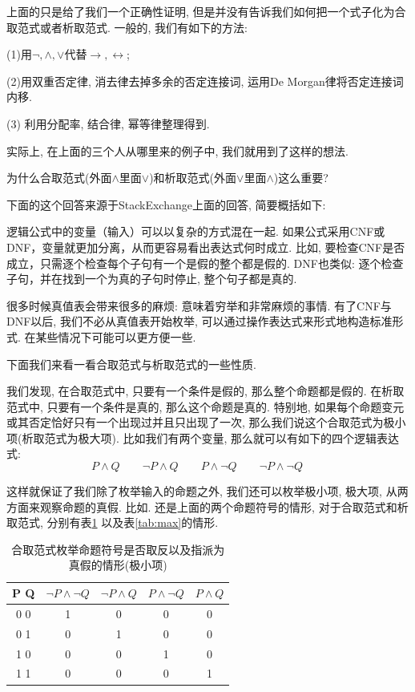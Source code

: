 上面的只是给了我们一个正确性证明, 但是并没有告诉我们如何把一个式子化为合取范式或者析取范式. 一般的, 我们有如下的方法: 

(1)用$\lnot,\land,\lor$代替$\to,\leftrightarrow$;

(2)用双重否定律, 消去律去掉多余的否定连接词, 运用De Morgan律将否定连接词内移. 

(3) 利用分配率, 结合律, 幂等律整理得到. 

实际上, 在上面的三个人从哪里来的例子中, 我们就用到了这样的想法. 


\begin{bonus}
	为什么合取范式(外面$\land$里面$\lor$)和析取范式(外面$\lor$里面$\land$)这么重要? 
\end{bonus}

下面的这个回答来源于StackExchange上面的回答\cite{why-important-cnf-dnf}, 简要概括如下:

逻辑公式中的变量（输入）可以以复杂的方式混在一起. 如果公式采用CNF或DNF，变量就更加分离，从而更容易看出表达式何时成立. 比如, 要检查CNF是否成立，只需逐个检查每个子句有一个是假的整个都是假的. DNF也类似: 逐个检查子句，并在找到一个为真的子句时停止, 整个句子都是真的. 

很多时候真值表会带来很多的麻烦: 意味着穷举和非常麻烦的事情. 有了CNF与DNF以后, 我们不必从真值表开始枚举, 可以通过操作表达式来形式地构造标准形式. 在某些情况下可能可以更方便一些.

下面我们来看一看合取范式与析取范式的一些性质. 

我们发现, 在合取范式中, 只要有一个条件是假的, 那么整个命题都是假的. 在析取范式中, 只要有一个条件是真的, 那么这个命题是真的. 特别地, 如果每个命题变元或其否定恰好只有一个出现过并且只出现了一次, 那么我们说这个合取范式为极小项(析取范式为极大项). 比如我们有两个变量, 那么就可以有如下的四个逻辑表达式: 
$$
P\land Q \qquad
 \lnot P \land Q \qquad
  P \land \lnot Q \qquad
   \lnot P \land \lnot Q \qquad
$$

这样就保证了我们除了枚举输入的命题之外, 我们还可以枚举极小项, 极大项, 从两方面来观察命题的真假. 比如. 还是上面的两个命题符号的情形, 对于合取范式和析取范式, 分别有表\ref{tab:min} 以及表\ref{tab:max}的情形. 

\begin{table}
	\centering
	\begin{tabular}{|c|c|c|c|c|}
		\hline
		P Q & $\lnot P \land \lnot Q$ & $\lnot P \land  Q$ & $P \land \lnot Q $& $ P \land  Q$\\
		\hline
		0 0 & 1 & 0 & 0 & 0\\
		0 1 & 0 & 1 & 0 & 0\\
		1 0 & 0 & 0 & 1 & 0\\
		1 1 & 0 & 0 & 0 & 1\\
		\hline
	\end{tabular}
	\label{tab:min}
	\caption{合取范式枚举命题符号是否取反以及指派为真假的情形(极小项)}
\end{table}

